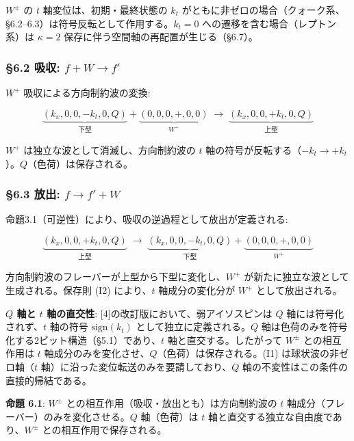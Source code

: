 \documentclass[
  a4paper,11pt]{ltjsarticle}
\theoremstyle{definition}
\theoremstyle{remark}
\begin{document}
\(W^{\pm}\) の \(t\) 軸変位は、初期・最終状態の \(k_t\)
がともに非ゼロの場合（クォーク系、§6.2--6.3）は符号反転として作用する。\(k_t = 0\)
への遷移を含む場合（レプトン系）は \(\kappa = 2\)
保存に伴う空間軸の再配置が生じる（§6.7）。

\subsubsection{\texorpdfstring{§6.2 吸収:
\(f + W \to f'\)}{§6.2 吸収: f + W \textbackslash to f\textquotesingle{}}}\label{ux5438ux53ce-f-w-to-f}

\(W^+\) 吸収による方向制約波の変換:

\[\underbrace{(k_x, 0, 0, -k_t, 0, Q)}_{\text{下型}} + \underbrace{(0, 0, 0, +, 0, 0)}_{W^+} \;\longrightarrow\; \underbrace{(k_x, 0, 0, +k_t, 0, Q)}_{\text{上型}}\]

\(W^+\) は独立な波として消滅し、方向制約波の \(t\)
軸の符号が反転する（\(-k_t \to +k_t\)）。\(Q\)（色荷）は保存される。

\subsubsection{\texorpdfstring{§6.3 放出:
\(f \to f' + W\)}{§6.3 放出: f \textbackslash to f\textquotesingle{} + W}}\label{ux653eux51fa-f-to-f-w}

命題3.1（可逆性）により、吸収の逆過程として放出が定義される:

\[\underbrace{(k_x, 0, 0, +k_t, 0, Q)}_{\text{上型}} \;\longrightarrow\; \underbrace{(k_x, 0, 0, -k_t, 0, Q)}_{\text{下型}} + \underbrace{(0, 0, 0, +, 0, 0)}_{W^+}\]

方向制約波のフレーバーが上型から下型に変化し、\(W^+\)
が新たに独立な波として生成される。保存則 (I2) により、\(t\)
軸成分の変化分が \(W^+\) として放出される。

\textbf{\(Q\) 軸と \(t\) 軸の直交性}:
{[}4{]}の改訂版において、弱アイソスピンは \(Q\)
軸には符号化されず、\(t\) 軸の符号 \(\mathrm{sign}(k_t)\)
として独立に定義される。\(Q\)
軸は色荷のみを符号化する2ビット構造（§5.1）であり、\(t\)
軸と直交する。したがって \(W^{\pm}\) との相互作用は \(t\)
軸成分のみを変化させ、\(Q\)（色荷）は保存される。(I1)
は球状波の非ゼロ軸（\(t\) 軸）に沿った変位転送のみを要請しており、\(Q\)
軸の不変性はこの条件の直接的帰結である。

\textbf{命題 6.1}: \(W^{\pm}\)
との相互作用（吸収・放出とも）は方向制約波の \(t\)
軸成分（フレーバー）のみを変化させる。\(Q\) 軸（色荷）は \(t\)
軸と直交する独立な自由度であり、\(W^{\pm}\) との相互作用で保存される。
\end{document}
